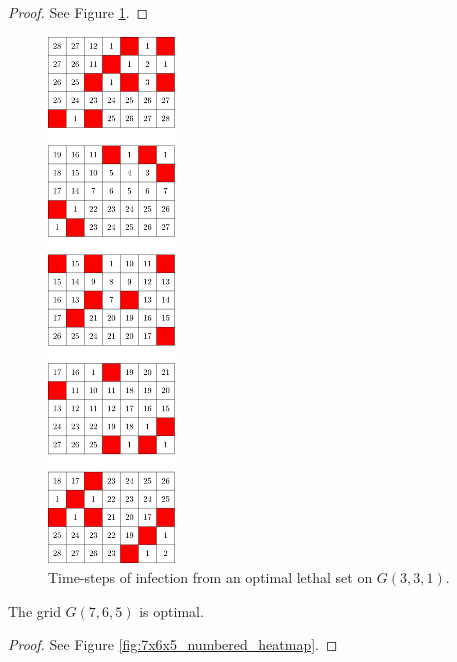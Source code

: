 \begin{proof}
See Figure \ref{fig:7x5x5_numbered_heatmap}.
\end{proof}

\begin{figure}[H]
\centering
\includegraphics[width=0.3\textwidth]{figures/A/7x5x5_numbered_heatmap.pdf}
\caption{Time-steps of infection from an optimal lethal set on $G(3,3,1)$.}
\label{fig:7x5x5_numbered_heatmap}
\end{figure}

\newpage

\begin{con}
\label{con:7x6x5}
The grid $G(7,6,5)$ is optimal.
\end{con}

\begin{proof}
See Figure \ref{fig:7x6x5_numbered_heatmap}.
\end{proof}


